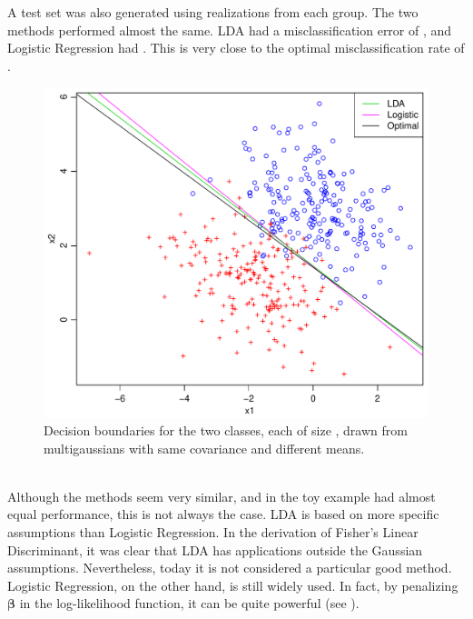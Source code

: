 A test set was also generated using  realizations from each group. The two methods performed almost the same. LDA had a misclassification error of , and Logistic Regression had . This is very close to the optimal misclassification rate of .
\\
%
\begin{figure}[h!]
\begin{center}
    \includegraphics[scale=0.5]{./figures/ldaVsLogistic.pdf}
\end{center}
\caption{Decision boundaries for the two classes, each of size , drawn from multigaussians with same covariance and different means.}
\label{fig:ldaVsLogistic}
\end{figure}
\\
Although the methods seem very similar, and in the toy example had almost equal performance, this is not always the case. LDA is based on more specific assumptions than Logistic Regression. In the derivation of Fisher's Linear Discriminant, it was clear that LDA has applications outside the Gaussian assumptions. Nevertheless, today it is not considered a particular good method. Logistic Regression, on the other hand, is still widely used.  In fact, by penalizing $\bm \beta$ in the log-likelihood function, it can be quite powerful (see \cite{modstat}).
